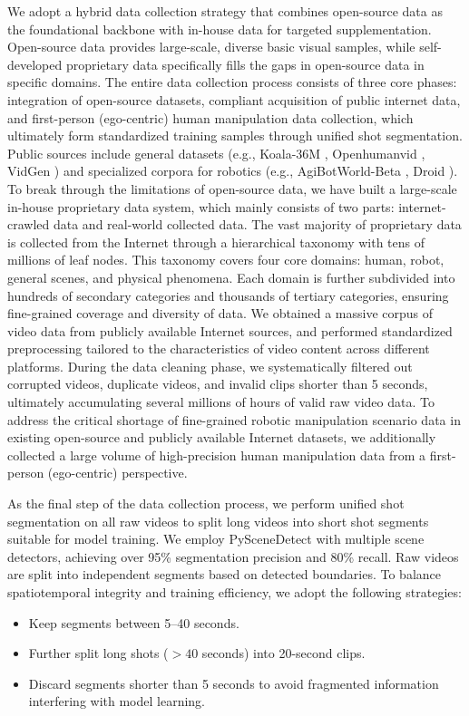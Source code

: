 \documentclass{llmxive}
\begin{document}
We adopt a hybrid data collection strategy that combines open-source data as the foundational backbone with in-house data for targeted supplementation. Open-source data provides large-scale, diverse basic visual samples, while self-developed proprietary data specifically fills the gaps in open-source data in specific domains. The entire data collection process consists of three core phases: integration of open-source datasets, compliant acquisition of public internet data, and first-person (ego-centric) human manipulation data collection, which ultimately form standardized training samples through unified shot segmentation.
Public sources include general datasets (e.g., Koala-36M \cite{wang2025koala36m}, Openhumanvid \cite{li2025openhumanvid}, VidGen \cite{tan2024vidgen1m}) and specialized corpora for robotics (e.g., AgiBotWorld-Beta \cite{AgiBotWorldContributors2025AgiBotWC}, Droid \cite{khazatsky2024droid}).
To break through the limitations of open-source data, we have built a large-scale in-house proprietary data system, which mainly consists of two parts: internet-crawled data and real-world collected data.
The vast majority of proprietary data is collected from the Internet through a hierarchical taxonomy with tens of millions of leaf nodes. This taxonomy covers four core domains: human, robot,  general scenes, and physical phenomena. Each domain is further subdivided into hundreds of secondary categories and thousands of tertiary categories, ensuring fine-grained coverage and diversity of data. 
We obtained a massive corpus of video data from publicly available Internet sources, and performed standardized preprocessing tailored to the characteristics of video content across different platforms. During the data cleaning phase, we systematically filtered out corrupted videos, duplicate videos, and invalid clips shorter than 5 seconds, ultimately accumulating several millions of hours of valid raw video data.
To address the critical shortage of fine-grained robotic manipulation scenario data in existing open-source and publicly available Internet datasets, we additionally collected a large volume of high-precision human manipulation data from a first-person (ego-centric) perspective.


As the final step of the data collection process, we perform unified shot segmentation on all raw videos to split long videos into short shot segments suitable for model training. We employ PySceneDetect with multiple scene detectors, achieving over 95\% segmentation precision and 80\% recall. Raw videos are split into independent segments based on detected boundaries. To balance spatiotemporal integrity and training efficiency, we adopt the following strategies:
\begin{itemize}
\item Keep segments between 5--40 seconds.
\item Further split long shots ($>40$ seconds) into 20-second clips.
\item Discard segments shorter than 5 seconds to avoid fragmented information interfering with model learning.
\end{itemize}
\end{document}
